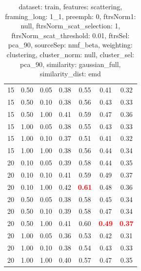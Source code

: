 \documentclass[12pt,a4paper,fleqn]{tufte-handout}
\begin{document}
\begin{table}
\begin{center}
\begin{tabular}{lllcccc}
15 & 0.50 & 0.05 & 0.38 & 0.55 & 0.41 & 0.32 \\                 
15 & 0.50 & 0.10 & 0.38 & 0.56 & 0.43 & 0.33 \\                 
15 & 0.50 & 1.00 & 0.41 & 0.59 & 0.47 & 0.36 \\                 
15 & 1.00 & 0.05 & 0.38 & 0.55 & 0.43 & 0.33 \\                 
15 & 1.00 & 0.10 & 0.37 & 0.51 & 0.41 & 0.32 \\                 
15 & 1.00 & 1.00 & 0.38 & 0.56 & 0.44 & 0.34 \\                 
20 & 0.10 & 0.05 & 0.39 & 0.58 & 0.44 & 0.35 \\                 
20 & 0.10 & 0.10 & 0.41 & 0.59 & 0.49 & 0.37 \\                 
20 & 0.10 & 1.00 & 0.42 & \textbf{\textcolor{red}{0.61}} & 0.48 & 0.36 \\                 
20 & 0.50 & 0.05 & 0.38 & 0.58 & 0.45 & 0.34 \\                 
20 & 0.50 & 0.10 & 0.39 & 0.58 & 0.47 & 0.34 \\                 
20 & 0.50 & 1.00 & 0.41 & 0.60 & \textbf{\textcolor{red}{0.49}} & \textbf{\textcolor{red}{0.37}} \\                 
20 & 1.00 & 0.05 & 0.36 & 0.53 & 0.42 & 0.31 \\                 
20 & 1.00 & 0.10 & 0.38 & 0.54 & 0.43 & 0.33 \\                 
20 & 1.00 & 1.00 & 0.40 & 0.57 & 0.47 & 0.35 \\                 
\end{tabular}                 
\end{center}                 
\caption{dataset: train, features: scattering, framing\_long: 1\_1, preemph: 0, ftrsNorm1: null, ftrsNorm\_scat\_selection: 1, ftrsNorm\_scat\_threshold: 0.01, ftrsSel: pca\_90, sourceSep: nmf\_beta, weighting: clustering, cluster\_norm: null, cluster\_sel: pca\_90, similarity: gaussian\_full, similarity\_dist: emd}                 
\label{datasetrFeaturscFraminlong1_1Preemp0Ftrsnorm1nuFtrsnoscatselect1Ftrsnoscatthresh0.01Ftrsselpc90SourcesepnmbeWeightclClustenormnuClusteselpc90SimilagafuSimiladistem}                 
\end{table}                 
 
 
\clearpage                
 
\end{document}
